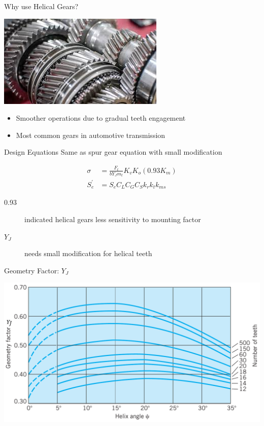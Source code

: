 \documentclass[10pt, svgnames]{beamer}
\begin{document}
\begin{frame}[label={sec:org58d164a}]{Why use Helical Gears?}
\begin{center}
\includegraphics[width=.9\linewidth]{pictures/helical-automotive.jpg}
\end{center}

\begin{itemize}
\item Smoother operations due to gradual teeth engagement

\item Most common gears in automotive transmission
\end{itemize}
\end{frame}

\begin{frame}[label={sec:org790554e}]{Design Equations}
Same as spur gear equation with small modification

\begin{align*}
    \sigma &= \frac{F_{t}}{bY_{J}m_{t}} K_{v} K_{o} (0.93 K_{m}) \\
    S_{e}^{\prime} &= S_{e}C_{L}C_{G}C_{S}k_{r}k_{t}k_{ms}
\end{align*}

\begin{description}
\item[{0.93}] indicated helical gears less sensitivity to mounting factor

\item[{\(Y_{J}\)}] needs small modification for helical teeth
\end{description}
\end{frame}

\begin{frame}[label={sec:orga37e3b2}]{Geometry Factor: \(Y_{J}\)}
\begin{center}
\includegraphics[width=.9\linewidth]{pictures/geometry-factor-helical.png}
\end{center}
\end{frame}
\end{document}
